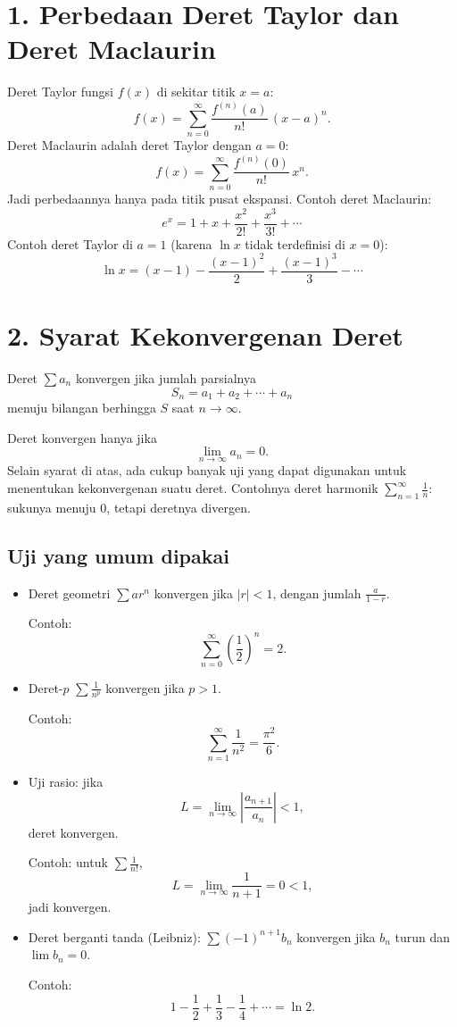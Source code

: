 \documentclass[12pt]{article}
\begin{document}
\section*{1. Perbedaan Deret Taylor dan Deret Maclaurin}

Deret Taylor fungsi $f(x)$ di sekitar titik $x=a$:
\[
  f(x) = \sum_{n=0}^{\infty} \frac{f^{(n)}(a)}{n!}\,(x-a)^n .
\]
Deret Maclaurin adalah deret Taylor dengan $a=0$:
\[
  f(x) = \sum_{n=0}^{\infty} \frac{f^{(n)}(0)}{n!}\,x^n .
\]
Jadi perbedaannya hanya pada titik pusat ekspansi. Contoh deret Maclaurin:
\[
  e^x = 1 + x + \frac{x^2}{2!} + \frac{x^3}{3!} + \cdots
\]
Contoh deret Taylor di $a=1$ (karena $\ln x$ tidak terdefinisi di $x=0$):
\[
  \ln x = (x-1) - \frac{(x-1)^2}{2} + \frac{(x-1)^3}{3} - \cdots
\]

\section*{2. Syarat Kekonvergenan Deret}

Deret $\sum a_n$ konvergen jika jumlah parsialnya
\[
  S_n = a_1 + a_2 + \cdots + a_n
\]
menuju bilangan berhingga $S$ saat $n \to \infty$.

Deret konvergen hanya jika
\[
  \lim_{n\to\infty} a_n = 0 .
\]
Selain syarat di atas, ada cukup banyak uji yang dapat digunakan untuk
menentukan kekonvergenan suatu deret. Contohnya deret harmonik
$\sum_{n=1}^{\infty} \frac{1}{n}$: sukunya menuju $0$, tetapi deretnya divergen.

\subsection*{Uji yang umum dipakai}

\begin{itemize}
  \item Deret geometri $\sum a r^n$ konvergen jika $|r| < 1$, dengan jumlah
  $\frac{a}{1-r}$.

  Contoh:
  \[
    \sum_{n=0}^{\infty} \left(\frac{1}{2}\right)^{n} = 2 .
  \]

  \item Deret-$p$ $\sum \frac{1}{n^p}$ konvergen jika $p > 1$.

  Contoh:
  \[
    \sum_{n=1}^{\infty} \frac{1}{n^2} = \frac{\pi^2}{6} .
  \]

  \item Uji rasio: jika
  \[
    L = \lim_{n\to\infty} \left| \frac{a_{n+1}}{a_n} \right| < 1,
  \]
  deret konvergen.

  Contoh: untuk $\sum \frac{1}{n!}$,
  \[
    L = \lim_{n\to\infty} \frac{1}{n+1} = 0 < 1,
  \]
  jadi konvergen.

  \item Deret berganti tanda (Leibniz): $\sum (-1)^{n+1} b_n$ konvergen jika
  $b_n$ turun dan $\lim b_n = 0$.

  Contoh:
  \[
    1 - \frac{1}{2} + \frac{1}{3} - \frac{1}{4} + \cdots = \ln 2 .
  \]
\end{itemize}
\end{document}
